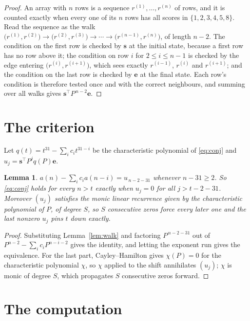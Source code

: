 \documentclass[11pt,a4paper]{article}
\theoremstyle{plain}
\newtheorem{lemma}[theorem]{Lemma}
\theoremstyle{definition}
\begin{document}
\begin{proof}
An array with $n$ rows is a sequence $r^{(1)},\dots,r^{(n)}$ of rows, and it is counted
exactly when every one of its $n$ rows has all scores in $\{1,2,3,4,5,8\}$. Read the sequence as the
walk $\bigl(r^{(1)},r^{(2)}\bigr)\to\bigl(r^{(2)},r^{(3)}\bigr)\to\cdots\to
\bigl(r^{(n-1)},r^{(n)}\bigr)$, of length $n-2$. The condition on the first row is
checked by $\mathbf{s}$ at the initial state, because a first row has no row above it; the
condition on row $i$ for $2\le i\le n-1$ is checked by the edge entering
$\bigl(r^{(i)},r^{(i+1)}\bigr)$, which sees exactly $r^{(i-1)}$, $r^{(i)}$ and
$r^{(i+1)}$; and the condition on the last row is checked by $\mathbf{e}$ at the final
state. Each row's condition is therefore tested once and with the correct neighbours, and
summing over all walks gives $\mathbf{s}^{\!\top}P^{\,n-2}\mathbf{e}$.
\end{proof}

\section{The criterion}

Let $q(t)=t^{31}-\sum_i c_i t^{31-i}$ be the characteristic polynomial of
\eqref{eq:conj} and $u_j=\mathbf{s}^{\!\top}P^{j}q(P)\mathbf{e}$.

\begin{lemma}\label{lem:crit}
$a(n)-\sum_i c_i a(n-i)=u_{\,n-2-31}$ whenever $n-31\ge2$. So \eqref{eq:conj}
holds for every $n>t$ exactly when $u_j=0$ for all $j>t-2-31$. Moreover $(u_j)$
satisfies the monic linear recurrence given by the characteristic polynomial of $P$, of
degree $S$, so $S$ consecutive zeros force every later one and the last nonzero $u_j$ pins
$t$ down exactly.
\end{lemma}

\begin{proof}
Substituting Lemma~\ref{lem:walk} and factoring $P^{\,n-2-31}$ out of
$P^{n-2}-\sum_i c_i P^{n-i-2}$ gives the identity, and letting the exponent run gives the
equivalence. For the last part, Cayley--Hamilton gives $\chi(P)=0$ for the characteristic
polynomial $\chi$, so $\chi$ applied to the shift annihilates $(u_j)$; $\chi$ is monic of
degree $S$, which propagates $S$ consecutive zeros forward.
\end{proof}

\section{The computation}
\end{document}
